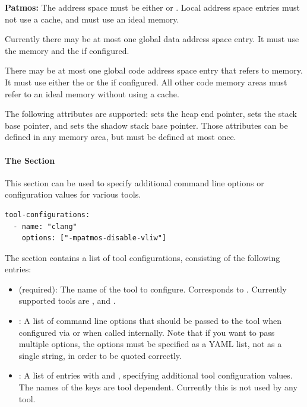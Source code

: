 \begin{itemize}
  \begin{framed}
  \textbf{Patmos:} The address space must be either  or . Local address space entries must not
  use a cache, and must use an ideal memory.

  Currently there may be at most one global data address space entry. It must use the  memory and the
   if configured.

  There may be at most one global code address space entry that refers to  memory. It must use either the
   or the  if configured. All other code memory areas must refer to an ideal memory without using a cache.

  
  The following attributes are supported:  sets the heap end pointer,  sets the stack
  base pointer, and  sets the shadow stack base pointer. Those attributes can be defined in
  any memory area, but must be defined at most once.
  \end{framed}

\end{itemize}


\paragraph{The  Section}

This section can be used to specify additional command line options or configuration values for various tools.

\begin{verbatim}
tool-configurations:
  - name: "clang"
    options: ["-mpatmos-disable-vliw"]
\end{verbatim}

The section contains a list of tool configurations, consisting of the following entries:
\begin{itemize}
\item {} (required): The name of the tool to configure. Corresponds to . Currently supported
  tools are ,  and . 
\item {}: A list of command line options that should be passed to the tool when configured via  or 
  when called internally. Note that if you want to pass multiple options, the options must be specified as a YAML list, not as a 
  single string, in order to be quoted correctly.
\item {}: A list of entries with  and , specifying additional tool configuration values.
  The names of the keys are tool dependent. 
  Currently this is not used by any tool.
\end{itemize}

